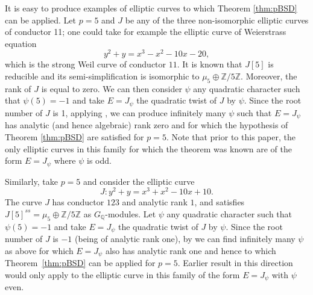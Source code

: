 \documentclass[a4paper,10pt]{amsart}
\numberwithin{equation}{section}
\numberwithin{equation}{section}
\theoremstyle{plain}
\theoremstyle{definition}
\theoremstyle{definition}
\theoremstyle{plain}
\theoremstyle{plain}
\theoremstyle{plain}
\theoremstyle{plain}
\newcommand{\Z}{\mathbb{Z}}
\newcommand{\Q}{\mathbb{Q}}
\begin{document}

It is easy to produce examples of elliptic curves to which Theorem \ref{thm:pBSD} can be applied. Let $p=5$ and $J$ be any of the three non-isomorphic elliptic curves of conductor 11; one could take for example 
the elliptic curve of Weierstrass equation
\[
y^2+y=x^3-x^2-10x-20,
\]
which is the strong Weil curve of conductor $11$.  
It is known that $J[5]$ is reducible and its semi-simplification is isomorphic to $\mu_5\oplus \Z/5\Z$. Moreover, the rank of $J$ is equal to zero. We can then consider $\psi$ any quadratic character such that $\psi(5)=-1$ and take $E=J_\psi$ the quadratic twist of $J$ by $\psi$. Since the root number of $J$ is 1, applying \cite[Thm.~B.1]{twist}, we can produce infinitely many $\psi$ such that $E=J_\psi$ has analytic (and hence algebraic) rank zero and for which the hypothesis of Theorem \ref{thm:pBSD} are satisfied for $p=5$. Note that prior to this paper, the only elliptic curves in this family for which the theorem was known are of the form $E=J_\psi$ where $\psi$ is odd.

Similarly, take $p=5$ and consider the elliptic curve
\begin{displaymath}
J: y^2+y=x^3+x^2-10x+10.
\end{displaymath} 
The curve $J$ has conductor $123$ and analytic rank $1$, and satisfies $J[5]^{ss}=\mu_5\oplus \Z/5\Z$ as $G_\Q$-modules. Let $\psi$ any quadratic character such that $\psi(5)=-1$ and take $E=J_\psi$ the quadratic twist of $J$ by $\psi$. Since the root number of $J$ is $-1$ (being of analytic rank one), by \cite[Thm.~B.2]{twist} we can find infinitely many $\psi$ as above for which $E=J_\psi$ also has analytic rank one and hence to which Theorem~\ref{thm:pBSD} can be applied for $p=5$. 
Earlier result in this direction would only apply to the elliptic curve in this family of the form $E=J_\psi$ with $\psi$ even. 
\end{document}
